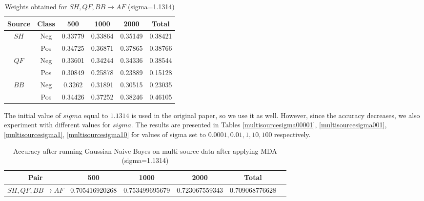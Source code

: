 \begin{table}[ht]
    \begin{center}
    \caption{Weights obtained for $SH, QF, BB \rightarrow AF$ (sigma=1.1314)}
    \begin{tabular}[c]{|c|c|c|c|c|c|}

        \hline
        Source & Class & 500 & 1000 & 2000 & Total \\
        \hline
    	\multirow{2}{*}{$SH$} &Neg & 0.33779 & 0.33864 & 0.35149 & 0.38421 \\ & Pos  & 0.34725 & 0.36871 & 0.37865  & 0.38766 \\ 
    	\hline
    	\multirow{2}{*}{$QF$} &Neg  & 0.33601 & 0.34244 & 0.34336 & 0.38544 \\ & Pos  & 0.30849 & 0.25878 & 0.23889  & 0.15128 \\
    	\hline
    	\multirow{2}{*}{$BB$} &Neg  & 0.3262  & 0.31891 & 0.30515 & 0.23035 \\ & Pos  & 0.34426 & 0.37252 & 0.38246  & 0.46105 \\ 

        \hline
    \end{tabular}
    \label{sampleweights}
   \end{center}
\end{table}



The initial value of $sigma$ equal to $1.1314$ is used in the original paper, so we use it as well. However, since the accuracy decreases, we also experiment with different values for $sigma$. The results are presented in Tables \ref{multisourcesigma00001}, \ref{multisourcesigma001}, \ref{multisourcesigma1}, \ref{multisourcesigma10}  for values of sigma set to $0.0001, 0.01, 1, 10, 100$ respectively.

\begin{table}[ht]
    \begin{center}
    \caption{Accuracy after running Gaussian Naive Bayes on multi-source data after applying MDA (sigma=1.1314)}
    \begin{tabular}[c]{|c|c|c|c|c|c|}
        \hline
        Pair & 500 & 1000 & 2000 & Total \\
        \hline
                             
        $SH, QF, BB \rightarrow AF$ & 0.705416920268 &  0.753499695679 & 0.723067559343 & 0.709068776628 \\ %

        \hline
    \end{tabular}
    \label{multisourcemda1}
   \end{center}
\end{table}



